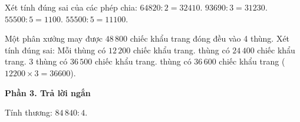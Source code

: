 \begin{ex} %
Xét tính đúng sai của các phép chia:
\choiceTF
{\True $64820 : 2 = 32410$.}
{\True $93690 : 3 = 31230$.}
{$55500 : 5 = 1100$.}
{\True $55500 : 5 = 11100$.}
\end{ex}

\begin{ex} %
Một phân xưởng may được $48\,800$ chiếc khẩu trang đóng đều vào 4 thùng. Xét tính đúng sai:
\choiceTF
{\True Mỗi thùng có $12\,200$ chiếc khẩu trang.}
{ thùng có $24\,400$ chiếc khẩu trang.}
{3 thùng có $36\,500$ chiếc khẩu trang.}
{ thùng có $36\,600$ chiếc khẩu trang ($12200 \times 3 = 36600$).}
\end{ex}

\textbf{Phần 3. Trả lời ngắn}

\begin{ex} %
Tính thương: $84\,840 : 4$.
\end{ex}

